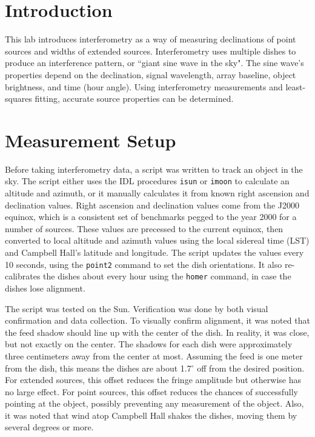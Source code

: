 \documentclass[12pt]{article}
\newcommand{\degree}{\ensuremath{^\circ} }
\begin{document}
\maketitle

\section{Introduction}
This lab introduces interferometry as a way of measuring declinations of point sources and widths of extended sources.
Interferometry uses multiple dishes to produce an interference pattern, or ``giant sine wave in the sky".
The sine wave's properties depend on the declination, signal wavelength, array baseline, object brightness, and time (hour angle).
Using interferometry measurements and least-squares fitting, accurate source properties can be determined.



\section{Measurement Setup}
Before taking interferometry data, a script was written to track an object in the sky.
The script either uses the IDL procedures \texttt{isun} or \texttt{imoon} to calculate an altitude and azimuth, or it manually calculates it from known right ascension and declination values.
Right ascension and declination values come from the J2000 equinox, which is a consistent set of benchmarks pegged to the year 2000 for a number of sources.
These values are precessed to the current equinox, then converted to local altitude and azimuth values using the local sidereal time (LST) and Campbell Hall's latitude and longitude.
The script updates the values every 10 seconds, using the \texttt{point2} command to set the dish orientations.
It also re-calibrates the dishes about every hour using the \texttt{homer} command, in case the dishes lose alignment.

The script was tested on the Sun.
Verification was done by both visual confirmation and data collection.
To visually confirm alignment, it was noted that the feed shadow should line up with the center of the dish.
In reality, it was close, but not exactly on the center.
The shadows for each dish were approximately three centimeters away from the center at most.
Assuming the feed is one meter from the dish, this means the dishes are about 1.7\degree off from the desired position.
For extended sources, this offset reduces the fringe amplitude but otherwise has no large effect.
For point sources, this offset reduces the chances of successfully pointing at the object, possibly preventing any measurement of the object.
Also, it was noted that wind atop Campbell Hall shakes the dishes, moving them by several degrees or more.
\end{document}
